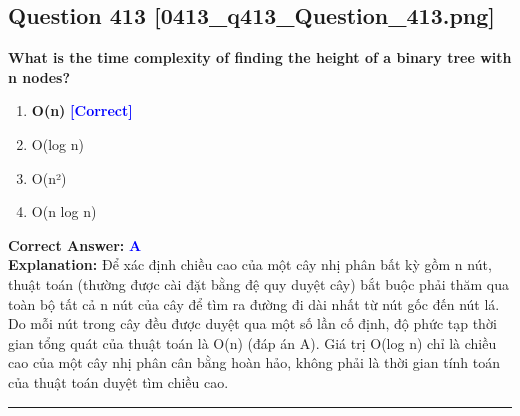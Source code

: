 \documentclass[11pt,a4paper]{article}
\begin{document}
\begin{minipage}{\textwidth}
\subsection*{Question 413 \quad \footnotesize{[0413\_q413\_Question\_413.png]}}
\noindent \textbf{What is the time complexity of finding the height of a binary tree with n nodes?}

\begin{enumerate}[label=\Alph*.]
    \item \textbf{O(n)} \hfill \textcolor{blue}{\textbf{[Correct]}}
    \item O(log n)
    \item O(n²)
    \item O(n log n)
\end{enumerate}

\noindent \textbf{Correct Answer:} \textcolor{blue}{\textbf{A}} \\[2pt]
\noindent \textbf{Explanation:} Để xác định chiều cao của một cây nhị phân bất kỳ gồm n nút, thuật toán (thường được cài đặt bằng đệ quy duyệt cây) bắt buộc phải thăm qua toàn bộ tất cả n nút của cây để tìm ra đường đi dài nhất từ nút gốc đến nút lá. Do mỗi nút trong cây đều được duyệt qua một số lần cố định, độ phức tạp thời gian tổng quát của thuật toán là O(n) (đáp án A). Giá trị O(log n) chỉ là chiều cao của một cây nhị phân cân bằng hoàn hảo, không phải là thời gian tính toán của thuật toán duyệt tìm chiều cao.

\par\vspace{0.3cm}
\hrule
\vspace{0.3cm}
\end{minipage}
\end{document}

